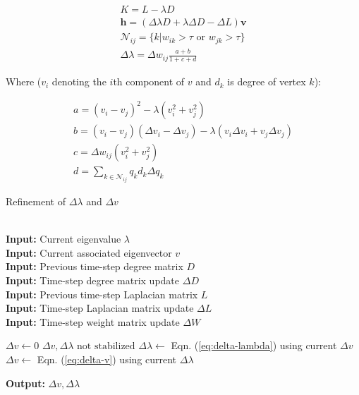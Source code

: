 \documentclass{article}
\begin{document}
\begin{align}
    K = L - \lambda D \\
    \textbf{h} = (\Delta\lambda D + \lambda \Delta D - \Delta L)\textbf{v} \\
    \mathcal{N}_{ij} = \{k|w_{ik} > \tau \text{ or } w_{jk} > \tau\} \\
    \Delta\lambda = \Delta w_{ij}\frac{a + b}{1 + c + d}\label{eq:delta-lambda}
\end{align}

Where ($v_i$ denoting the $i$th component of $v$ and $d_k$ is degree of vertex $k$):

\begin{align}
    a = (v_i - v_j)^2 - \lambda(v_i^2 + v_j^2) \\
    b = (v_i - v_j)(\Delta v_i - \Delta v_j) - \lambda(v_i\Delta v_i + v_j\Delta v_j) \\
    c = \Delta w_{ij}(v_i^2 + v_j^2) \\
    d = \sum_{k\in\mathcal{N}_{ij}} q_k d_k\Delta q_k
\end{align}

\begin{algorithm}
\caption{Refinement of $\Delta\lambda$ and $\Delta v$ \cite{incremental}}\label{alg:refinement}
\begin{algorithmic}[1]
 \\
\textbf{Input:} Current eigenvalue $\lambda$ \\
\textbf{Input:} Current associated eigenvector $v$ \\
\textbf{Input:} Previous time-step degree matrix $D$ \\
\textbf{Input:} Time-step degree matrix update $\Delta D$ \\
\textbf{Input:} Previous time-step Laplacian matrix $L$ \\
\textbf{Input:} Time-step Laplacian matrix update $\Delta L$ \\
\textbf{Input:} Time-step weight matrix update $\Delta W$

\State $\Delta v \gets 0$
\While $\Delta v, \Delta\lambda \text{ not stabilized}$
    \State $\Delta\lambda \gets$ Eqn. (\ref{eq:delta-lambda}) using current $\Delta v$ 
    \State $\Delta v \gets$ Eqn. (\ref{eq:delta-v}) using current $\Delta \lambda$ 
\EndWhile

\textbf{Output:} $\Delta v, \Delta\lambda$
\EndProcedure
\end{algorithmic}
\end{algorithm}
\end{document}
